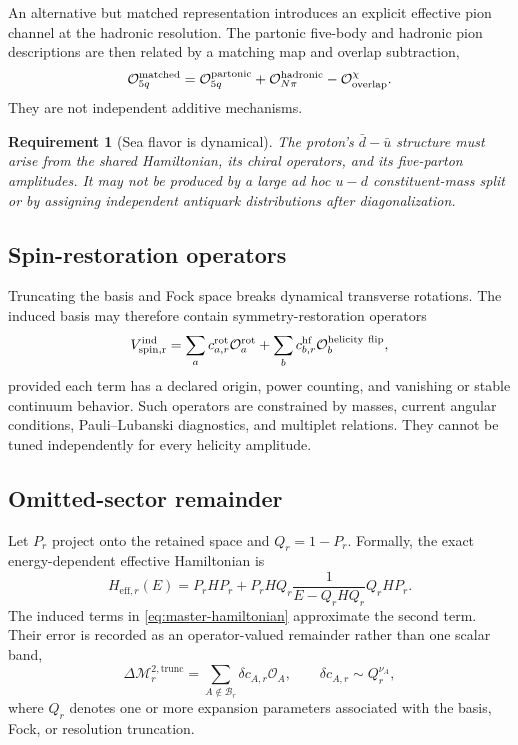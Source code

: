 \documentclass[11pt]{article}
\newtheorem{requirement}[definition]{Requirement}
\newcommand{\cO}{\mathcal O}
\newcommand{\cM}{\mathcal M}
\newcommand{\cB}{\mathcal B}
\newcommand{\eff}{\mathrm{eff}}
\newcommand{\ind}{\mathrm{ind}}
\newcommand{\trunc}{\mathrm{trunc}}
\begin{document}
An alternative but matched representation introduces an explicit effective
pion channel at the hadronic resolution.  The partonic five-body and hadronic
pion descriptions are then related by a matching map and overlap subtraction,
\begin{equation}
 \cO_{5q}^{\rm matched}
 =\cO_{5q}^{\rm partonic}
 +\cO_{N\pi}^{\rm hadronic}
 -\cO_{\rm overlap}^{\chi}.
 \label{eq:chiral-overlap-subtraction}
\end{equation}
They are not independent additive mechanisms.

\begin{requirement}[Sea flavor is dynamical]
The proton's \(\bar d-\bar u\) structure must arise from the shared Hamiltonian,
its chiral operators, and its five-parton amplitudes.  It may not be produced by
a large ad hoc \(u-d\) constituent-mass split or by assigning independent
antiquark distributions after diagonalization.
\label{req:sea-dynamical}
\end{requirement}

\subsection{Spin-restoration operators}

Truncating the basis and Fock space breaks dynamical transverse rotations.  The
induced basis may therefore contain symmetry-restoration operators
\begin{equation}
 V_{\rm spin,r}^{\ind}
 =\sum_a c_{a,r}^{\rm rot}\cO_{a}^{\rm rot}
 +\sum_b c_{b,r}^{\rm hf}\cO_{b}^{\rm helicity\ flip},
 \label{eq:spin-restoration}
\end{equation}
provided each term has a declared origin, power counting, and vanishing or
stable continuum behavior.  Such operators are constrained by masses,
current angular conditions, Pauli--Lubanski diagnostics, and multiplet
relations.  They cannot be tuned independently for every helicity amplitude.

\subsection{Omitted-sector remainder}

Let \(P_r\) project onto the retained space and \(Q_r=1-P_r\).  Formally, the
exact energy-dependent effective Hamiltonian is
\begin{equation}
 H_{\eff,r}(E)
 =P_rHP_r
 +P_rHQ_r\frac{1}{E-Q_rHQ_r}Q_rHP_r.
 \label{eq:feshbach-hamiltonian}
\end{equation}
The induced terms in \cref{eq:master-hamiltonian} approximate the second term.
Their error is recorded as an operator-valued remainder rather than one scalar
band,
\begin{equation}
 \Delta\cM_{r}^{2,\trunc}
 =\sum_{A\notin\cB_r}
 \delta c_{A,r}\cO_A,
 \qquad
 \delta c_{A,r}\sim Q_r^{\nu_A},
 \label{eq:operator-remainder}
\end{equation}
where \(Q_r\) denotes one or more expansion parameters associated with the
basis, Fock, or resolution truncation.
\end{document}
